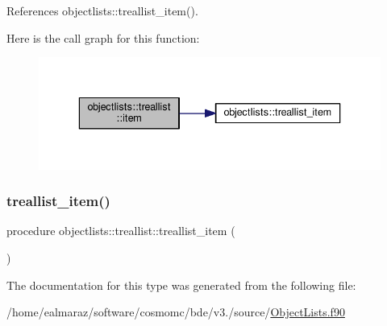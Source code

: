 References objectlists\+::treallist\+\_\+item().

Here is the call graph for this function\+:
\nopagebreak
\begin{figure}[H]
\begin{center}
\leavevmode
\includegraphics[width=336pt]{structobjectlists_1_1treallist_a25a81392742f84618bc6be4a81064b0d_cgraph}
\end{center}
\end{figure}
\mbox{\label{structobjectlists_1_1treallist_a32c935dc0996f12c74ffccdd24e279f3}} 
\subsubsection{\texorpdfstring{treallist\+\_\+item()}{treallist\_item()}}
{\footnotesize\ttfamily procedure objectlists\+::treallist\+::treallist\+\_\+item (\begin{DoxyParamCaption}{ }\end{DoxyParamCaption})\hspace{0.3cm}{\ttfamily [private]}}



The documentation for this type was generated from the following file\+:\begin{DoxyCompactItemize}
\item 
/home/ealmaraz/software/cosmomc/bde/v3./source/\mbox{\hyperlink{ObjectLists_8f90}{Object\+Lists.\+f90}}\end{DoxyCompactItemize}
